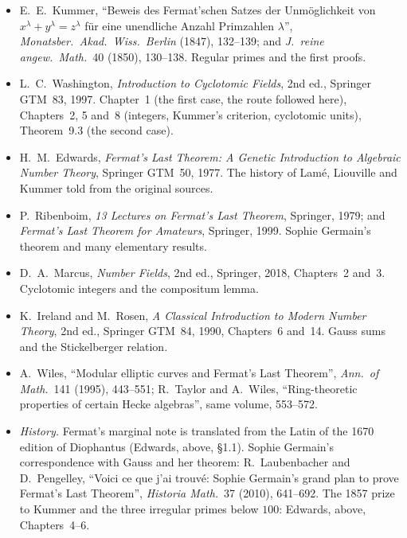 \begin{itemize}
\item E.~E.~Kummer, ``Beweis des Fermat'schen Satzes der Unm\"oglichkeit von $x^\lambda+y^\lambda=z^\lambda$ f\"ur eine unendliche
Anzahl Primzahlen $\lambda$'', \emph{Monatsber.\ Akad.\ Wiss.\ Berlin} (1847), 132--139; and \emph{J.\ reine angew.\ Math.}\ 40
(1850), 130--138. Regular primes and the first proofs.
\item L.~C.~Washington, \emph{Introduction to Cyclotomic Fields}, 2nd ed., Springer GTM~83, 1997. Chapter~1 (the first case, the
route followed here), Chapters~2, 5 and~8 (integers, Kummer's criterion, cyclotomic units), Theorem~9.3 (the second case).
\item H.~M.~Edwards, \emph{Fermat's Last Theorem: A Genetic Introduction to Algebraic Number Theory}, Springer GTM~50, 1977. The
history of Lamé, Liouville and Kummer told from the original sources.
\item P.~Ribenboim, \emph{13 Lectures on Fermat's Last Theorem}, Springer, 1979; and \emph{Fermat's Last Theorem for Amateurs},
Springer, 1999. Sophie Germain's theorem and many elementary results.
\item D.~A.~Marcus, \emph{Number Fields}, 2nd ed., Springer, 2018, Chapters~2 and~3. Cyclotomic integers and the compositum lemma.
\item K.~Ireland and M.~Rosen, \emph{A Classical Introduction to Modern Number Theory}, 2nd ed., Springer GTM~84, 1990,
Chapters~6 and~14. Gauss sums and the Stickelberger relation.
\item A.~Wiles, ``Modular elliptic curves and Fermat's Last Theorem'', \emph{Ann.\ of Math.}\ 141 (1995), 443--551; R.~Taylor and
A.~Wiles, ``Ring-theoretic properties of certain Hecke algebras'', same volume, 553--572.
\item \emph{History.} Fermat's marginal note is translated from the Latin of the 1670 edition of Diophantus (Edwards, above,
\S1.1). Sophie Germain's correspondence with Gauss and her theorem: R.~Laubenbacher and D.~Pengelley, ``Voici ce que j'ai
trouv\'e: Sophie Germain's grand plan to prove Fermat's Last Theorem'', \emph{Historia Math.}\ 37 (2010), 641--692.
The 1857 prize to Kummer and the three irregular primes below $100$: Edwards, above, Chapters~4--6.
\end{itemize}
